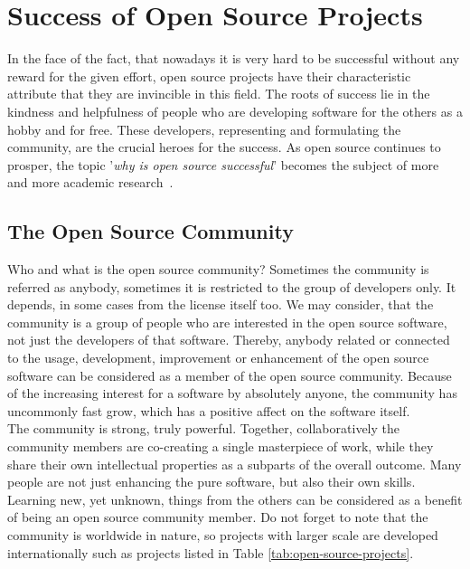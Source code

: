 \documentclass[11pt,a4paper]{article}
\theoremstyle{definition}
\begin{document}
\section{Success of Open Source Projects}

    In the face of the fact, that nowadays it is very hard to be successful without any reward for the given effort, open source projects have their characteristic attribute that they are invincible in this field. The roots of success lie in the kindness and helpfulness of people who are developing software for the others as a hobby and for free. These developers, representing and formulating the community, are the crucial heroes for the success. As open source continues to prosper, the topic '\textit{why is open source successful}' becomes the subject of more and more academic research~\cite{IEEE:open-source-success}.

    \subsection{The Open Source Community}

    Who and what is the open source community? Sometimes the community is referred as anybody, sometimes it is restricted to the group of developers only. It depends, in some cases from the license itself too. We may consider, that the community is a group of people who are interested in the open source software, not just the developers of that software. Thereby, anybody related or connected to the usage, development, improvement or enhancement of the open source software can be considered as a member of the open source community. Because of the increasing interest for a software by absolutely anyone, the community has uncommonly fast grow, which has a positive affect on the software itself.\\

    The community is strong, truly powerful. Together, collaboratively the community members are co-creating a single masterpiece of work, while they share their own intellectual properties as a subparts of the overall outcome. Many people are not just enhancing the pure software, but also their own skills. Learning new, yet unknown, things from the others can be considered as a benefit of being an open source community member. Do not forget to note that the community is worldwide in nature, so projects with larger scale are developed internationally such as projects listed in Table \ref{tab:open-source-projects}.
\end{document}
